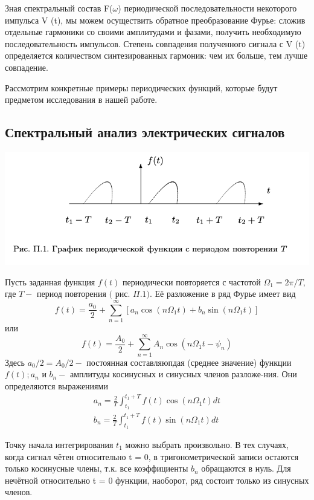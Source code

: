 \documentclass[a4paper,12pt]{article} %
\begin{document}
Зная спектральный состав F($\omega$) периодической последовательности некоторого импульса V (t), мы можем осуществить обратное преобразование Фурье: сложив отдельные гармоники со своими амплитудами и фазами, получить необходимую последовательность импульсов. Степень совпадения полученного сигнала с V (t) определяется количеством синтезированных гармоник: чем их больше, тем лучше совпадение.

Рассмотрим конкретные примеры периодических функций, которые будут предметом исследования в нашей работе.

\subsection{Спектральный анализ электрических сигналов}

\begin{center}
\includegraphics[width=0.7\linewidth]{1.jpeg}\\
\end{center}

Пусть заданная функция $f(t)$ периодически повторяется с частотой $\Omega_{1}=2 \pi / T,$ где $T-$ период повторения $($ рис. $\Pi .1) .$ Её разложение в ряд Фурье имеет вид
$$
f(t)=\frac{a_{0}}{2}+\sum_{n=1}^{\infty}\left[a_{n} \cos \left(n \Omega_{1} t\right)+b_{n} \sin \left(n \Omega_{1} t\right)\right]
$$
или
$$
f(t)=\frac{A_{0}}{2}+\sum_{n=1}^{\infty} A_{n} \cos \left(n \Omega_{1} t-\psi_{n}\right)
$$
Здесь $a_{0} / 2=A_{0} / 2-$ постоянная составляюпдая (среднее значение) функции $f(t) ; a_{n}$ и $b_{n}-$ амплитуды косинусных и синусных членов разложе-ния. Они определяются выражениями
$$
\begin{array}{l}
a_{n}=\frac{2}{T} \int_{t_{1}}^{t_{1}+T} f(t) \cos \left(n \Omega_{1} t\right) d t \\
b_{n}=\frac{2}{T} \int_{t_{1}}^{t_{1}+T} f(t) \sin \left(n \Omega_{1} t\right) d t
\end{array}
$$

Точку начала интегрирования $t_1$ можно выбрать произвольно.
В тех случаях, когда сигнал чётен относительно t = 0, в тригонометрической записи остаются только косинусные члены, т.к. все коэффициенты $b_n$ обращаются в нуль. Для нечётной относительно t = 0 функции, наоборот, ряд состоит только из синусных членов.
\end{document}
